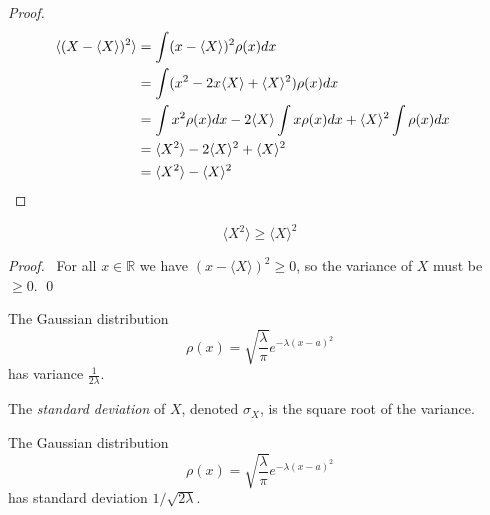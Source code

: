 \begin{proof}
\pf
\begin{align*}
\langle (X - \langle X \rangle)^2 \rangle
& = \int (x - \langle X \rangle)^2 \rho(x) dx \\
& = \int (x^2 - 2 x \langle X \rangle + \langle X \rangle^2) \rho(x) dx \\
& = \int x^2 \rho(x) dx - 2 \langle X \rangle \int x \rho(x) dx + \langle X \rangle^2 \int \rho(x) dx \\
& = \langle X^2 \rangle - 2 \langle X \rangle^2 + \langle X \rangle^2 \\
& = \langle X^2 \rangle - \langle X \rangle^2 & \qed
\end{align*}
\end{proof}

\begin{cor}
\[ \langle X^2 \rangle \geq \langle X \rangle^2 \]
\end{cor}

\begin{proof}
\pf\ For all $x \in \mathbb{R}$ we have $(x - \langle X \rangle)^2 \geq 0$, so the variance of $X$ must be $\geq 0$. \qed
\end{proof}

\begin{ex}
The Gaussian distribution
\[ \rho(x) = \sqrt{\frac{\lambda}{\pi}} e^{- \lambda(x-a)^2} \]
has variance $\frac{1}{2 \lambda}$.
\end{ex}

\begin{df}
The \emph{standard deviation} of $X$, denoted $\sigma_X$, is the square root of the variance.
\end{df}

\begin{ex}
The Gaussian distribution
\[ \rho(x) = \sqrt{\frac{\lambda}{\pi}} e^{- \lambda(x-a)^2} \]
has standard deviation $1/\sqrt{2 \lambda}$.
\end{ex}
